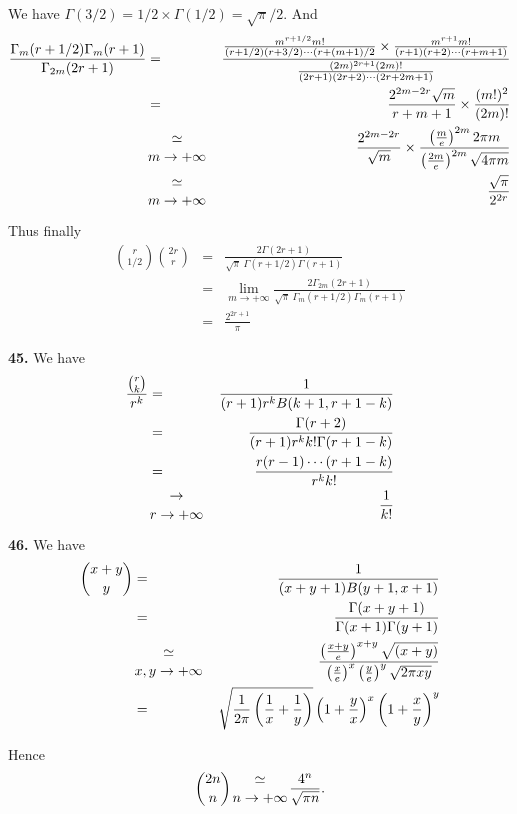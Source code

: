 \documentclass[a4paper,12pt]{article}
\newcommand{\newpar}[1]{\bigskip \noindent \textbf{#1.}}
\begin{document}
We have $\Gamma(3/2) = 1/2 \times \Gamma(1/2) = \sqrt{\pi}/2$.  And
\begin{eqnarray*}
  \frac{\Gamma_m(r+1/2)\Gamma_m(r+1)}{\Gamma_{2m}(2r+1)} &=&
  \frac{\frac{m^{r+1/2}m!}{(r+1/2)(r+3/2)\cdots(r+(m+1)/2} \times
    \frac{m^{r+1}m!}{(r+1)(r+2)\cdots(r+m+1)}}
       {\frac{(2m)^{2r+1}(2m)!}{(2r+1)(2r+2)\cdots(2r+2m+1)}} \\
       &=& \frac{2^{2m-2r}\sqrt{m}}{r+m+1} \times
       \frac{(m!)^2}{(2m)!}\\
       &{\simeq \atop m \to +\infty}& \frac{2^{2m-2r}}{\sqrt{m}}\times
       \frac{\left(\frac{m}{e}\right)^{2m} 2 \pi
         m}{\left(\frac{2m}{e}\right)^{2m} \sqrt{4\pi m}} \\
       &{\simeq \atop m \to +\infty}& \frac{\sqrt{\pi}}{2^{2r}}
\end{eqnarray*}

Thus finally
\begin{eqnarray*}
  {r \choose 1/2}{2r \choose r} &=&
  \frac{2\Gamma(2r+1)}{\sqrt{\pi}\ \Gamma(r+1/2)\Gamma(r+1)} \\
  &=& \lim_{m \to +\infty}
  \frac{2\Gamma_{2m}(2r+1)}{\sqrt{\pi}\ \Gamma_m(r+1/2)\Gamma_m(r+1)}
\\
&=& \frac{2^{2r+1}}{\pi}
\end{eqnarray*}

\newpar{45} We have
\begin{eqnarray*}
  \frac{{r \choose k}}{r^k} &=& \frac{1}{(r+1)r^kB(k+1, r+1-k)} \\
  &=& \frac{\Gamma(r+2)}{(r+1)r^kk!\Gamma(r+1-k)} \\
  &=& \frac{r(r-1)\cdots(r+1-k)}{r^kk!} \\
  &{\to \atop r \to +\infty}& \frac{1}{k!}
\end{eqnarray*}

\newpar{46} We have
\begin{eqnarray*}
  {x+y \choose y} &=& \frac{1}{(x+y+1)B(y+1, x+1)} \\
  &=& \frac{\Gamma(x+y+1)}{\Gamma(x+1)\Gamma(y+1)} \\
  &{\simeq \atop x,y \to +\infty}&
  \frac{\left(\frac{x+y}{e}\right)^{x+y}\sqrt{(x+y)}}{\left(\frac{x}{e}\right)^{x}\left(\frac{y}{e}\right)^{y}
    \sqrt{2\pi x y}} \\
  &=& \sqrt{\frac{1}{2\pi}\left(\frac{1}{x}+\frac{1}{y}\right)}
  \left(1 + \frac{y}{x}\right)^x   \left(1 + \frac{x}{y}\right)^y
\end{eqnarray*}

Hence
\[ {2n \choose n} {\simeq \atop n \to +\infty} \frac{4^n}{\sqrt{\pi
    n}}.\]
\end{document}

